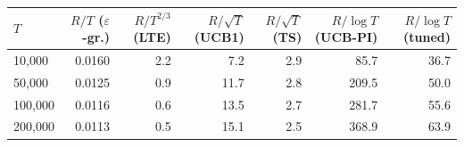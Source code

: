\begin{tabular}{lrrrrrr}
\toprule
$T$ & $R/T$ ($\varepsilon$-gr.) & $R/T^{2/3}$ (LTE) & $R/\sqrt{T}$ (UCB1) & $R/\sqrt{T}$ (TS) & $R/\log T$ (UCB-PI) & $R/\log T$ (tuned) \\
\midrule
10,000 & 0.0160 & 2.2 & 7.2 & 2.9 & 85.7 & 36.7 \\
50,000 & 0.0125 & 0.9 & 11.7 & 2.8 & 209.5 & 50.0 \\
100,000 & 0.0116 & 0.6 & 13.5 & 2.7 & 281.7 & 55.6 \\
200,000 & 0.0113 & 0.5 & 15.1 & 2.5 & 368.9 & 63.9 \\
\bottomrule
\end{tabular}
